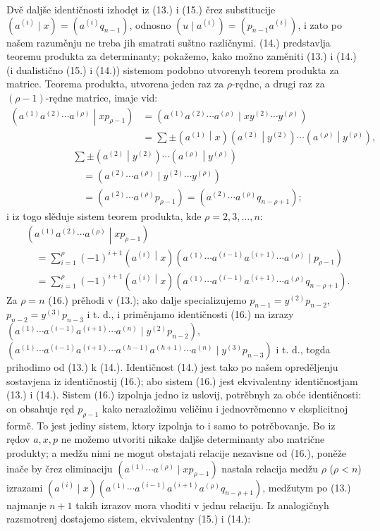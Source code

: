 \documentclass[11pt]{article}
\newcommand{\pair}[2]{\left(#1\middle|#2\right)}
\begin{document}
Dvě daljše identičnosti izhodęt iz (13.) i (15.) črez substitucije $(a^{(i)}\mid x)=(a^{(i)}q_{n-1})$, odnosno $(u\mid a^{(i)})=(p_{n-1}a^{(i)})$, i zato po našem razuměnju ne treba jih smatrati suštno različnymi. (14.) predstavlja teoremu produkta za determinanty; pokažemo, kako možno zaměniti (13.) i (14.) (i dualistično (15.) i (14.)) sistemom podobno utvorenyh teorem produkta za matrice. Teorema produkta, utvorena jeden raz za $\rho$-rędne, a drugi raz za $(\rho-1)$-rędne matrice, imaje vid:
\[
\begin{aligned}
\pair{a^{(1)}a^{(2)}\cdots a^{(\rho)}}{xp_{\rho-1}}
&=(a^{(1)}a^{(2)}\cdots a^{(\rho)}\mid xy^{(2)}\cdots y^{(\rho)})\\
&=\sum\pm\pair{a^{(1)}}{x}\pair{a^{(2)}}{y^{(2)}}\cdots\pair{a^{(\rho)}}{y^{(\rho)}},
\end{aligned}
\]
\[
\begin{aligned}
&\sum\pm\pair{a^{(2)}}{y^{(2)}}\cdots\pair{a^{(\rho)}}{y^{(\rho)}}\\
&\quad=(a^{(2)}\cdots a^{(\rho)}\mid y^{(2)}\cdots y^{(\rho)})\\
&\quad=(a^{(2)}\cdots a^{(\rho)}p_{\rho-1})
=(a^{(2)}\cdots a^{(\rho)}q_{n-\rho+1});
\end{aligned}
\]
i iz togo slěduje sistem teorem produkta, kde $\rho=2,3,\ldots,n$:
\begin{equation}
\begin{aligned}
&\pair{a^{(1)}a^{(2)}\cdots a^{(\rho)}}{xp_{\rho-1}}\\
&\quad=\sum_{i=1}^{\rho}(-1)^{i+1}\pair{a^{(i)}}{x}
(a^{(1)}\cdots a^{(i-1)}a^{(i+1)}\cdots a^{(\rho)}\mid p_{\rho-1})\\
&\quad=\sum_{i=1}^{\rho}(-1)^{i+1}\pair{a^{(i)}}{x}
(a^{(1)}\cdots a^{(i-1)}a^{(i+1)}\cdots a^{(\rho)}q_{n-\rho+1}).
\end{aligned}
\tag{16}
\end{equation}
Za $\rho=n$ (16.) prěhodi v (13.); ako dalje specializujemo $p_{n-1}=y^{(2)}p_{n-2}$, $p_{n-2}=y^{(3)}p_{n-3}$ i t. d., i priměnjamo identičnosti (16.) na izrazy $(a^{(1)}\cdots a^{(i-1)}a^{(i+1)}\cdots a^{(n)}\mid y^{(2)}p_{n-2})$, $(a^{(1)}\cdots a^{(i-1)}a^{(i+1)}\cdots a^{(h-1)}a^{(h+1)}\cdots a^{(n)}\mid y^{(3)}p_{n-3})$ i t. d., togda prihodimo od (13.) k (14.). Identičnost (14.) jest tako po našem opreděljenju sostavjena iz identičnostij (16.); abo sistem (16.) jest ekvivalentny identičnostjam (13.) i (14.). Sistem (16.) izpolnja jedno iz uslovij, potrěbnyh za obće identičnosti: on obsahuje ręd $p_{\rho-1}$ kako nerazložimu veličinu i jednovrěmenno v eksplicitnoj formě. To jest jediny sistem, ktory izpolnja to i samo to potrěbovanje. Bo iz rędov $a,x,p$ ne možemo utvoriti nikake daljše determinanty abo matrične produkty; a medžu nimi ne mogut obstajati relacije nezavisne od (16.), poněže inače by črez eliminaciju $(a^{(1)}\cdots a^{(\rho)}\mid xp_{\rho-1})$ nastala relacija medžu $\rho$ ($\rho<n$) izrazami $(a^{(i)}\mid x)(a^{(1)}\cdots a^{(i-1)}a^{(i+1)}a^{(\rho)}q_{n-\rho+1})$, medžutym po (13.) najmanje $n+1$ takih izrazov mora vhoditi v jednu relaciju. Iz analogičnyh razsmotrenj dostajemo sistem, ekvivalentny (15.) i (14.):
\end{document}
